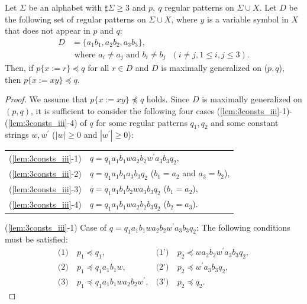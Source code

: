\begin{lem}\label{lem:3consts_iii}
  Let $\Sigma$ be an alphabet with $\sharp\Sigma \ge 3$ and $p,~q$ regular patterns on $\Sigma\cup X$.
  Let $D$ be the following set of regular patterns on $\Sigma\cup X$, where $y$ is a variable symbol in $X$ that does not appear in $p$ and $q$:
  \begin{align*}
  D & = \{ a_{1}b_{1}, a_{2}b_{2}, a_{3}b_{3}\},\\
  & \mbox{ where } a_{i} \ne a_{j} \mbox{ and } b_{i} \ne b_{j} \mbox{ } (i\ne j, 1\le i,j\le 3).
  \end{align*}
  Then, if $p \{ x := r \} \preceq q$ for all $r \in D$ and $D$ is maximally generalized on ($p,q$), then $p \{ x := xy \} \preceq q$.
\end{lem}

\begin{proof}
We assume that $p \{ x := xy \} \not\preceq q$ holds.
Since $D$ is maximally generalized on $(p,q)$, it is sufficient to consider the following four cases (\ref{lem:3consts_iii}-1)-(\ref{lem:3consts_iii}-4) of $q$ for some regular patterns $q_{1},q_{2}$ and some constant strings $w,w^{\prime}$ ($|w|\geq 0$ and $|w^{\prime}|\geq 0$):

\smallskip

\noindent
\begin{tabular}{ll}
(\ref{lem:3consts_iii}-1) & $q=q_{1}a_{1}b_{1}wa_{2}b_{2}w^{\prime}a_{3}b_{3}q_{2}$,\\
(\ref{lem:3consts_iii}-2) & $q=q_{1}a_{1}b_{1}a_{3}b_{3}q_{2}$ ($b_{1}=a_{2}$ and $a_{3}=b_{2}$),\\
(\ref{lem:3consts_iii}-3) & $q=q_{1}a_{1}b_{1}b_{2}wa_{3}b_{3}q_{2}$ ($b_{1}=a_{2}$),\\
(\ref{lem:3consts_iii}-4) & $q=q_{1}a_{1}b_{1}wa_{2}b_{2}b_{3}q_{2}$ ($b_{2}=a_{3}$).
\end{tabular}

\smallskip

\noindent
(\ref{lem:3consts_iii}-1) Case of $q=q_{1}a_{1}b_{1}wa_{2}b_{2}w^{\prime}a_{3}b_{3}q_{2}$:
The following conditions must be satisfied:
\begin{align*}
\textrm{(1)}~& p_{1} \preceq q_{1}, & \textrm{(1')}~& p_{2} \preceq wa_{2}b_{2}w^{\prime}a_{3}b_{3}q_{2}, \\
\textrm{(2)}~& p_{1} \preceq q_{1}a_{1}b_{1}w, & \textrm{(2')}~& p_{2} \preceq w^{\prime}a_{3}b_{3}q_{2}, \\
\textrm{(3)}~& p_{1} \preceq q_{1}a_{1}b_{1}wa_{2}b_{2}w^{\prime}, & \textrm{(3')}~& p_{2} \preceq q_{2}.
\end{align*}


\end{proof}

